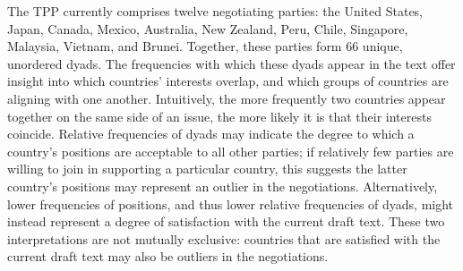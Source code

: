 \documentclass[12pt]{article}
\begin{document}
The TPP currently comprises twelve negotiating parties: the United States, Japan, Canada, Mexico, 
Australia, New Zealand, Peru, Chile, Singapore, Malaysia, Vietnam, and Brunei. Together, 
these parties form 66 
unique, unordered dyads. 
% 
The frequencies with which these dyads appear in the text offer insight into which countries' interests overlap, 
and which groups of countries are 
aligning with one another. Intuitively, the more frequently two countries appear together on the same 
side of an issue, the more likely it is that their interests coincide. Relative frequencies of 
dyads may 
indicate the degree to which a country's positions are acceptable to all other parties; if relatively 
few parties are willing to join in supporting a particular country, this suggests the latter country's 
positions may represent an outlier in the negotiations. Alternatively, lower frequencies of positions, 
and thus lower relative frequencies of dyads, might instead represent a degree of satisfaction with 
the current draft text. These two interpretations are not mutually exclusive: countries that are 
satisfied with the current draft text may also be outliers in the negotiations.
\end{document}
